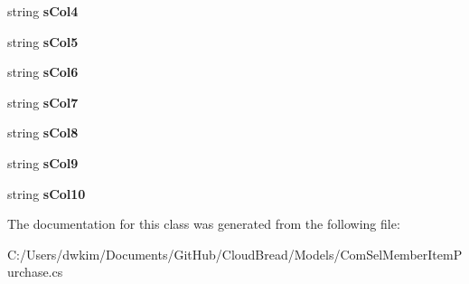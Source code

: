 \begin{DoxyCompactItemize}
\item 
string {\bfseries s\+Col4}\hypertarget{a00066_a20f208d7043a93c081a8637d4f80868f}{}\label{a00066_a20f208d7043a93c081a8637d4f80868f}

\item 
string {\bfseries s\+Col5}\hypertarget{a00066_aae7d0050afb7a8339c4ca970a434b28f}{}\label{a00066_aae7d0050afb7a8339c4ca970a434b28f}

\item 
string {\bfseries s\+Col6}\hypertarget{a00066_a2579a27e2063d27b9106938063b322e7}{}\label{a00066_a2579a27e2063d27b9106938063b322e7}

\item 
string {\bfseries s\+Col7}\hypertarget{a00066_a2d194d9c506bfba06ce6e6880e628a2e}{}\label{a00066_a2d194d9c506bfba06ce6e6880e628a2e}

\item 
string {\bfseries s\+Col8}\hypertarget{a00066_ab89b8afa9ab412d90d0e14ae7512b673}{}\label{a00066_ab89b8afa9ab412d90d0e14ae7512b673}

\item 
string {\bfseries s\+Col9}\hypertarget{a00066_a3a2d3c787bfa27b90657d2709b33bdd9}{}\label{a00066_a3a2d3c787bfa27b90657d2709b33bdd9}

\item 
string {\bfseries s\+Col10}\hypertarget{a00066_a2e3757df2abeb349a90b89440935593e}{}\label{a00066_a2e3757df2abeb349a90b89440935593e}

\end{DoxyCompactItemize}


The documentation for this class was generated from the following file\+:\begin{DoxyCompactItemize}
\item 
C\+:/\+Users/dwkim/\+Documents/\+Git\+Hub/\+Cloud\+Bread/\+Models/Com\+Sel\+Member\+Item\+Purchase.\+cs\end{DoxyCompactItemize}
